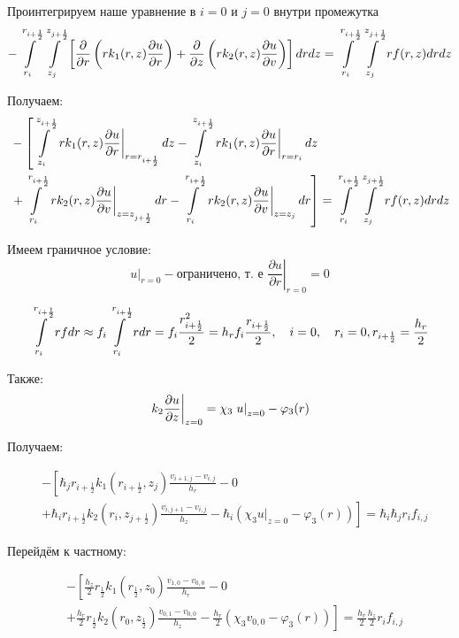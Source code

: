 Проинтегрируем наше уравнение в $ i = 0 $ и $ j = 0 $ внутри промежутка
\[
  - \int\limits^{r_{i +\frac{1}{2}}}_{r_{i }} \int\limits^{z_{j +\frac{1}{2}}}_{z_{j }} \left [ \pdv{}{r} \left ( r k_1(r, z) \pdv{u}{r} \right ) 
  + \pdv{}{z} \left ( rk_2(r, z)\pdv{u}{v} \right ) \right ] dr dz = \int\limits^{r_{i +\frac{1}{2}}}_{r_{i }} \int\limits^{z_{j +\frac{1}{2}}}_{z_{j }} rf(r, z) dr dz
\]

Получаем:
\begin{align*}
  &- \left [
   \int\limits^{z_{i+\frac{1}{2}}}_{z_{i}}  \left . r k_1(r, z) \pdv{u}{r} \right \vert_{r = r_{i + \frac{1}{2}}} dz
  - \int\limits^{z_{i+\frac{1}{2}}}_{z_{i}} \left . r k_1(r, z) \pdv{u}{r} \right \vert_{r = r_{i}} dz
  \right . \\
  &\left . + \int\limits^{r_{i+\frac{1}{2}}}_{r_{i}} \left . rk_2(r, z)\pdv{u}{v} \right \vert_{z = z_{j + \frac{1}{2}}} dr
  - \int\limits^{r_{i+\frac{1}{2}}}_{r_{i}} \left . rk_2(r, z)\pdv{u}{v} \right \vert_{z = z_{j}} dr
  \right ] = \int\limits^{r_{i +\frac{1}{2}}}_{r_{i }} \int\limits^{z_{j +\frac{1}{2}}}_{z_{j }} rf(r, z) dr dz
\end{align*}

Имеем граничное условие:
\[
  \left . u \right \vert_{r=0} - \text{ограничено, т. е } \left . \frac{\partial u}{ \partial r} \right |_{r = 0} = 0
\]

\[
  \int\limits^{r_{i+ \frac{1}{2}}}_{r_{i}} rf dr \approx f_i \int\limits^{r_{i + \frac{1}{2}}}_{r_{i}} r dr = 
  f_i \frac{r^2_{i + \frac{1}{2}}}{2} = h_r f_i \frac{r_{i + \frac{1}{2}}}{2},
  \quad i = 0, \quad r_i = 0, r_{i + \frac{1}{2}} = \frac{h_r}{2}
\]

Также:
\[
  \left . k_2 \pdv{u}{z} \right \vert_{z=0} = \chi_3 \left . u \right \vert_{z=0} - \varphi_3(r) 
\]

Получаем:

\begin{align*}
  &- \left [ 
  \hbar_j r_{i+\frac{1}{2}} k_1(r_{i+\frac{1}{2}}, z_j) \frac{v_{i+1, j} - v_{i, j}}{h_{r}}
  - 0
  \right . \\
  &\left .
  + \hbar_i r_{i+\frac{1}{2}} k_2(r_i, z_{j+\frac{1}{2}}) \frac{v_{i, j + 1} - v_{i, j}}{h_{z}}
  - \hbar_i (\chi_3 \left . u \right \vert_{z=0} - \varphi_3(r))
  \right ]  = \hbar_i \hbar_j r_i f_{i, j}
\end{align*}

Перейдём к частному:

\begin{align*}
  &- \left [ 
  \frac{h_z}{2} r_{\frac{1}{2}} k_1(r_{\frac{1}{2}}, z_0) \frac{v_{1, 0} - v_{0, 0}}{h_{r}}
  - 0
  \right . \\
  &\left .
  + \frac{h_r}{2} r_{\frac{1}{2}} k_2(r_0, z_{\frac{1}{2}}) \frac{v_{0, 1} - v_{0, 0}}{h_{z}}
  - \frac{h_r}{2} (\chi_3 v_{0, 0} - \varphi_3(r))
  \right ]  = \frac{h_r}{2} \frac{h_z}{2} r_i f_{i, j}
\end{align*}

